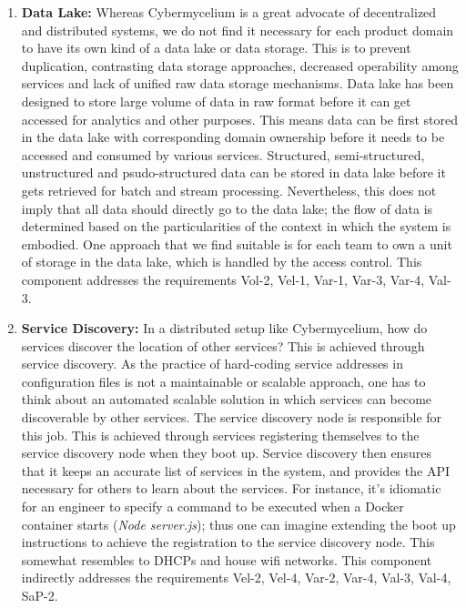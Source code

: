 \documentclass{bmcart}
\begin{document}
\begin{enumerate}
    \item \textbf{Data Lake:} Whereas Cybermycelium is a great advocate of decentralized and distributed systems, we do not find it necessary for each product domain to have its own kind of a data lake or data storage. This is to prevent duplication, contrasting data storage approaches, decreased operability among services and lack of unified raw data storage mechanisms. Data lake has been designed to store large volume of data in raw format before it can get accessed for analytics and other purposes. This means data can be first stored in the data lake with corresponding domain ownership before it needs to be accessed and consumed by various services. Structured, semi-structured, unstructured and psudo-structured data can be stored in data lake before it gets retrieved for batch and stream processing. Nevertheless, this does not imply that all data should directly go to the data lake; the flow of data is determined based on the particularities of the context in which the system is embodied. One approach that we find suitable is for each team to own a unit of storage in the data lake, which is handled by the access control. This component addresses the requirements Vol-2, Vel-1, Var-1, Var-3, Var-4, Val-3.
    

    \item \textbf{Service Discovery:} In a distributed setup like Cybermycelium, how do services discover the location of other services? This is achieved through service discovery. As the practice of hard-coding service addresses in configuration files is not a maintainable or scalable approach, one has to think about an automated scalable solution in which services can become discoverable by other services. The service discovery node is responsible for this job. This is achieved through services registering themselves to the service discovery node when they boot up. Service discovery then ensures that it keeps an accurate list of services in the system, and provides the API necessary for others to learn about the services. For instance, it's idiomatic for an engineer to specify a command to be executed when a Docker container starts (\emph{Node server.js}); thus one can imagine extending the boot up instructions to achieve the registration to the service discovery node. This somewhat resembles to DHCPs and house wifi networks.  This component indirectly addresses the requirements Vel-2, Vel-4, Var-2, Var-4, Val-3, Val-4, SaP-2.


\end{enumerate}
\end{document}
